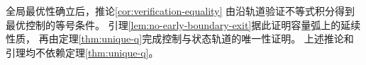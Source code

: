全局最优性确立后，推论\ref{cor:verification-equality}
由沿轨道验证不等式积分得到最优控制的等号条件。
引理\ref{lem:no-early-boundary-exit}据此证明容量弧上的延续性质，
再由定理\ref{thm:unique-q}完成控制与状态轨道的唯一性证明。
上述推论和引理均不依赖定理\ref{thm:unique-q}。
